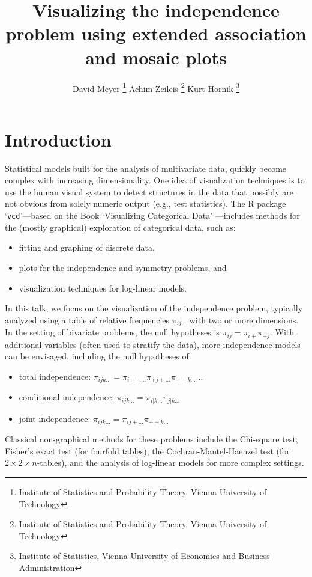 \documentclass[10pt]{article}
\begin{document}
\title{Visualizing the independence problem using extended association and
mosaic plots}
\author{David Meyer
\thanks{Institute of Statistics and Probability Theory, Vienna University of Technology}
\And
Achim Zeileis 
\thanks{Institute of Statistics and Probability Theory, Vienna
University of Technology}
\And
Kurt Hornik
\thanks{Institute of Statistics, Vienna
University of Economics and Business Administration}
}

\maketitle

\section{Introduction}

Statistical models built for the analysis of multivariate data,
quickly become complex with increasing dimensionality.
One idea of visualization techniques is to
use the human visual system to detect structures in the data that
possibly are not obvious from solely numeric output (e.g., test
statistics).
The {\sf R} package `\texttt{vcd}'---based on the Book `Visualizing Categorical
Data' \cite[][]{vcd:Friendly:2000}---includes methods for the (mostly
graphical) exploration of categorical data, such as:
\begin{itemize}
 \item fitting and graphing of discrete data,
 \item plots for the independence and symmetry problems, and
 \item visualization techniques for log-linear models.
\end{itemize}
In this talk, we focus on the visualization of the independence
problem, typically analyzed using a table of relative frequencies $\pi_{ij\dots}$
with two or more dimensions. In the setting of bivariate problems, the
null hypotheses is $\pi_{ij} = \pi_{i+}\pi_{+j}$. With additional variables
(often used to stratify the data), more independence models can be
envisaged, including the null hypotheses of:
\begin{itemize}
 \item total independence:
  $\pi_{ijk\dots} = \pi_{i++\dots}\pi_{+j+\dots}\pi_{++k\dots}\dots$
 \item conditional independence:
  $\pi_{ijk\dots} = \pi_{i|k\dots}\pi_{j|k\dots}$
 \item joint independence:
  $\pi_{ijk\dots} = \pi_{ij+\dots}\pi_{++k\dots}$
\end{itemize}
Classical non-graphical methods for these problems include the Chi-square
test, Fisher's exact test (for fourfold tables), the
Cochran-Mantel-Haenzel test (for $2 \times 2 \times
n$-tables), and the analysis of log-linear models for more
complex settings.
    
\end{document}
